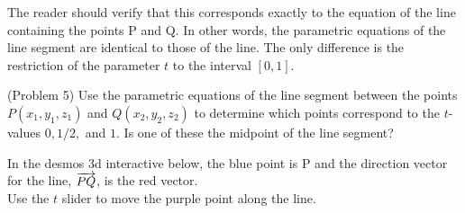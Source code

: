 \documentclass[handout]{ximera}
\begin{document}
The reader should verify that this corresponds exactly to the equation of the line containing the points P and Q.
In other words, the parametric equations of the line segment are identical to those of the line. 
The only difference is the restriction of the parameter $t$ to the interval $[0,1]$. 

\begin{problem}(Problem 5)
Use the parametric equations of the line segment between the points  $P(x_1, y_1, z_1)$ and $Q(x_2, y_2, z_2)$
to determine which points correspond to the $t$-values $0, 1/2, $ and $1$. 
Is one of these the midpoint of the line segment?
\end{problem}

In the desmos 3d interactive below, the blue point is P and the direction vector for the line, $\overrightarrow{PQ}$, is the red vector.\\
Use the $t$ slider to move the purple point along the line. 
\begin{center}
\end{center}
\end{document}
